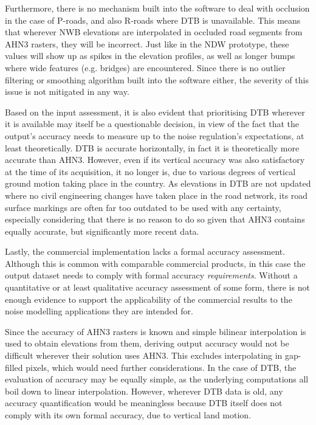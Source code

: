 Furthermore, there is no mechanism built into the software to deal with occlusion in the case of P-roads, and also R-roads where DTB is unavailable. This means that wherever NWB elevations are interpolated in occluded road segments from AHN3 rasters, they will be incorrect. Just like in the NDW prototype, these values will show up as spikes in the elevation profiles, as well as longer bumps where wide features (e.g. bridges) are encountered. Since there is no outlier filtering or smoothing algorithm built into the software either, the severity of this issue is not mitigated in any way.

Based on the input assessment, it is also evident that prioritising DTB wherever it is available may itself be a questionable decision, in view of the fact that the output's accuracy needs to measure up to the noise regulation's expectations, at least theoretically. DTB is accurate horizontally, in fact it is theoretically more accurate than AHN3. However, even if its vertical accuracy was also satisfactory at the time of its acquisition, it no longer is, due to various degrees of vertical ground motion taking place in the country. As elevations in DTB are not updated where no civil engineering changes have taken place in the road network, its road surface markings are often far too outdated to be used with any certainty, especially considering that there is no reason to do so given that AHN3 contains equally accurate, but significantly more recent data.

Lastly, the commercial implementation lacks a formal accuracy assessment. Although this is common with comparable commercial products, in this case the output dataset needs to comply with formal accuracy \textit{requirements}. Without a quantitative or at least qualitative accuracy assessment of some form, there is not enough evidence to support the applicability of the commercial results to the noise modelling applications they are intended for.

Since the accuracy of AHN3 rasters is known and simple bilinear interpolation is used to obtain elevations from them, deriving output accuracy would not be difficult wherever their solution uses AHN3. This excludes interpolating in gap-filled pixels, which would need further considerations. In the case of DTB, the evaluation of accuracy may be equally simple, as the underlying computations all boil down to linear interpolation. However, wherever DTB data is old, any accuracy quantification would be meaningless because DTB itself does not comply with its own formal accuracy, due to vertical land motion.